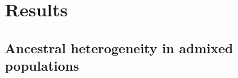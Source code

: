 \documentclass[12pt]{article}
\newcommand{\add}[1]{{\color{red}{[... #1 ...]}}}
\begin{document}
%








\section{Results}

\subsection{Ancestral heterogeneity in admixed populations}
\end{document}
